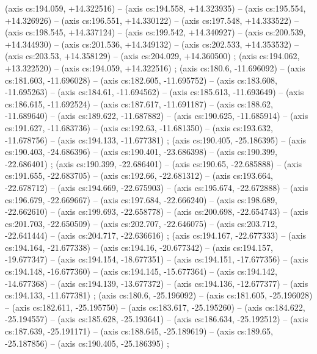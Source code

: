     (axis cs:194.059,    +14.322516) --  (axis cs:194.558,    +14.323935) --  (axis cs:195.554,    +14.326926) --  (axis cs:196.551,    +14.330122) --  (axis cs:197.548,    +14.333522) --  (axis cs:198.545,    +14.337124) --  (axis cs:199.542,    +14.340927) --  (axis cs:200.539,    +14.344930) --  (axis cs:201.536,    +14.349132) --  (axis cs:202.533,    +14.353532) --  (axis cs:203.53,    +14.358129) --  (axis cs:204.029,    +14.360500) ;
    (axis cs:194.062,    +13.322520) --  (axis cs:194.059,    +14.322516) ;
    (axis cs:180.6,    -11.696092) --  (axis cs:181.603,    -11.696028) --  (axis cs:182.605,    -11.695752) --  (axis cs:183.608,    -11.695263) --  (axis cs:184.61,    -11.694562) --  (axis cs:185.613,    -11.693649) --  (axis cs:186.615,    -11.692524) --  (axis cs:187.617,    -11.691187) --  (axis cs:188.62,    -11.689640) --  (axis cs:189.622,    -11.687882) --  (axis cs:190.625,    -11.685914) --  (axis cs:191.627,    -11.683736) --  (axis cs:192.63,    -11.681350) --  (axis cs:193.632,    -11.678756) --  (axis cs:194.133,    -11.677381) ;
    (axis cs:190.405,    -25.186395) --  (axis cs:190.403,    -24.686396) --  (axis cs:190.401,    -23.686398) --  (axis cs:190.399,    -22.686401) ;
    (axis cs:190.399,    -22.686401) --  (axis cs:190.65,    -22.685888) --  (axis cs:191.655,    -22.683705) --  (axis cs:192.66,    -22.681312) --  (axis cs:193.664,    -22.678712) --  (axis cs:194.669,    -22.675903) --  (axis cs:195.674,    -22.672888) --  (axis cs:196.679,    -22.669667) --  (axis cs:197.684,    -22.666240) --  (axis cs:198.689,    -22.662610) --  (axis cs:199.693,    -22.658778) --  (axis cs:200.698,    -22.654743) --  (axis cs:201.703,    -22.650509) --  (axis cs:202.707,    -22.646075) --  (axis cs:203.712,    -22.641444) --  (axis cs:204.717,    -22.636616) ;
    (axis cs:194.167,    -22.677333) --  (axis cs:194.164,    -21.677338) --  (axis cs:194.16,    -20.677342) --  (axis cs:194.157,    -19.677347) --  (axis cs:194.154,    -18.677351) --  (axis cs:194.151,    -17.677356) --  (axis cs:194.148,    -16.677360) --  (axis cs:194.145,    -15.677364) --  (axis cs:194.142,    -14.677368) --  (axis cs:194.139,    -13.677372) --  (axis cs:194.136,    -12.677377) --  (axis cs:194.133,    -11.677381) ;
    (axis cs:180.6,    -25.196092) --  (axis cs:181.605,    -25.196028) --  (axis cs:182.611,    -25.195750) --  (axis cs:183.617,    -25.195260) --  (axis cs:184.622,    -25.194557) --  (axis cs:185.628,    -25.193641) --  (axis cs:186.634,    -25.192512) --  (axis cs:187.639,    -25.191171) --  (axis cs:188.645,    -25.189619) --  (axis cs:189.65,    -25.187856) --  (axis cs:190.405,    -25.186395) ;
